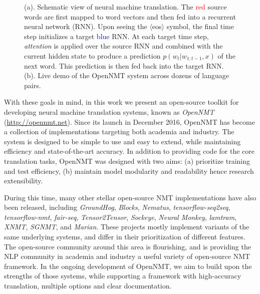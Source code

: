 \documentclass[]{article}
\begin{document}
\begin{figure}[t]
  \centering
  \caption{\small (a). Schematic view of neural machine translation. The \textcolor{red}{red} source words are first mapped to word vectors and then fed into a recurrent neural network (RNN). Upon seeing the $\langle$eos$\rangle$ symbol, the final time step initializes a target \textcolor{blue}{blue} RNN. At each target time step, \textit{attention} is applied over the source RNN and combined with the current hidden state to produce a prediction $p(w_t| w_{1: t-1}, x)$ of the next word. This prediction is then fed back into the target RNN. (b). Live demo of the OpenNMT system across dozens of language pairs.}
  \label{fig:ab}
\end{figure}

With these goals in mind, in this work we present an open-source toolkit for developing
neural machine translation systems, known as \textit{OpenNMT} (\url{http://opennmt.net}). Since its launch in December 2016, OpenNMT has become a collection of implementations targeting both academia and industry. The system is designed to be simple to use and easy to extend, while maintaining efficiency and state-of-the-art accuracy. In
addition to providing code for the core translation tasks, OpenNMT was
designed with two aims: (a) prioritize training and test
efficiency, (b) maintain model modularity and readability hence research extensibility.

During this time, many other stellar open-source NMT implementations
have also been released, including \textit{GroundHog},
\textit{Blocks}, \textit{Nematus}, \textit{tensorflow-seq2seq},
\textit{tensorflow-nmt}, \textit{fair-seq},  \textit{Tensor2Tensor}, \textit{Sockeye},
\textit{Neural Monkey}, \textit{lamtram}, \textit{XNMT},
\textit{SGNMT}, and \textit{Marian}. These projects mostly implement
variants of the same underlying systems, and differ in their
prioritization of different features. The open-source community around
this area is flourishing, and is providing the NLP community in
academia and industry a useful variety of open-source NMT framework.
In the ongoing development of OpenNMT, we aim to build upon the
strengths of those systems, while supporting a framework with
high-accuracy translation, multiple options and clear documentation.
\end{document}
